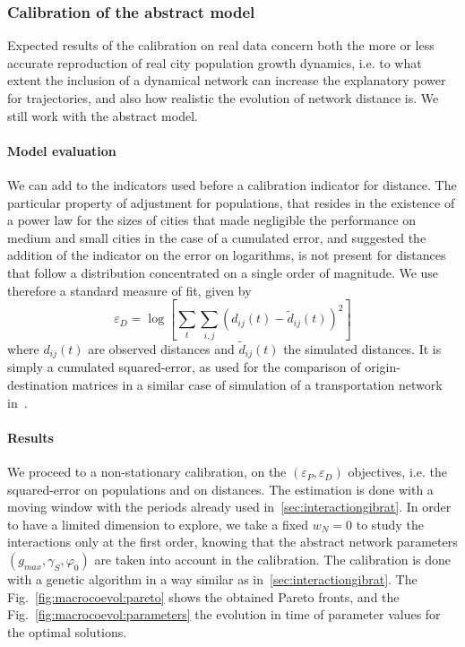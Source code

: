 \subsubsection{Calibration of the abstract model}


Expected results of the calibration on real data concern both the more or less accurate reproduction of real city population growth dynamics, i.e. to what extent the inclusion of a dynamical network can increase the explanatory power for trajectories, and also how realistic the evolution of network distance is. We still work with the abstract model.


\paragraph{Model evaluation}


We can add to the indicators used before a calibration indicator for distance. The particular property of adjustment for populations, that resides in the existence of a power law for the sizes of cities that made negligible the performance on medium and small cities in the case of a cumulated error, and suggested the addition of the indicator on the error on logarithms, is not present for distances that follow a distribution concentrated on a single order of magnitude. We use therefore a standard measure of fit, given by
\[
\varepsilon_D = \log \left[ \sum_t \sum_{i,j} \left(d_{ij}(t) - \tilde{d}_{ij}(t)\right)^2\right]
\]
where $d_{ij}(t)$ are observed distances and $\tilde{d}_{ij}(t)$ the simulated distances. It is simply a cumulated squared-error, as used for the comparison of origin-destination matrices in a similar case of simulation of a transportation network in~\cite{jacobs2016transport}.


\paragraph{Results}

We proceed to a non-stationary calibration, on the $(\varepsilon_P,\varepsilon_D)$ objectives, i.e. the squared-error on populations and on distances. The estimation is done with a moving window with the periods already used in~\ref{sec:interactiongibrat}. In order to have a limited dimension to explore, we take a fixed $w_N = 0$ to study the interactions only at the first order, knowing that the abstract network parameters $(g_{max},\gamma_S,\varphi_0)$ are taken into account in the calibration. The calibration is done with a genetic algorithm in a way similar as in~\ref{sec:interactiongibrat}. The Fig.~\ref{fig:macrocoevol:pareto} shows the obtained Pareto fronts, and the Fig.~\ref{fig:macrocoevol:parameters} the evolution in time of parameter values for the optimal solutions.

